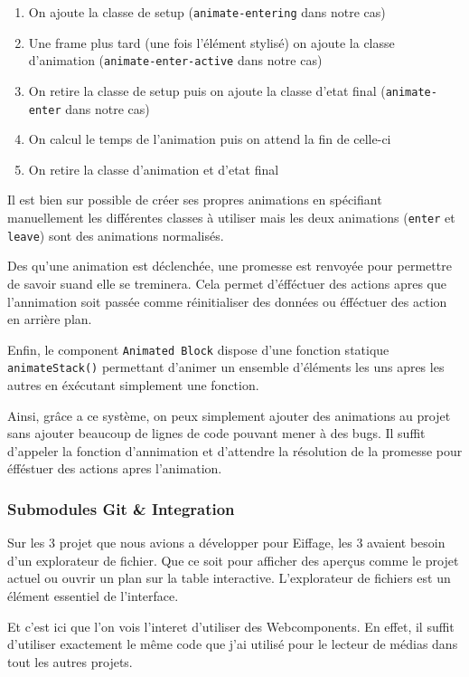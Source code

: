 \begin{enumerate}
    \item On ajoute la classe de setup (\texttt{animate-entering} dans notre cas)
    \item Une frame plus tard (une fois l'élément stylisé) on ajoute la classe d'animation (\texttt{animate-enter-active} dans notre cas)
    \item On retire la classe de setup puis on ajoute la classe d'etat final (\texttt{animate-enter} dans notre cas)
    \item On calcul le temps de l'animation puis on attend la fin de celle-ci
    \item On retire la classe d'animation et d'etat final
\end{enumerate}

Il est bien sur possible de créer ses propres animations en spécifiant manuellement les différentes classes à utiliser mais les deux animations (\texttt{enter} et \texttt{leave}) sont des animations normalisés.

Des qu'une animation est déclenchée, une promesse est renvoyée pour permettre de savoir suand elle se treminera.
Cela permet d'éfféctuer des actions apres que l'annimation soit passée comme réinitialiser des données ou éfféctuer des action en arrière plan.

Enfin, le component \texttt{Animated Block} dispose d'une fonction statique \texttt{animateStack()} permettant d'animer un ensemble d'éléments les uns apres les autres en éxécutant simplement une fonction.

Ainsi, grâce a ce système, on peux simplement ajouter des animations au projet sans ajouter beaucoup de lignes de code pouvant mener à des bugs.
Il suffit d'appeler la fonction d'annimation et d'attendre la résolution de la promesse pour éfféstuer des actions apres l'animation.

\subsubsection{Submodules Git \& Integration}

Sur les 3 projet que nous avions a développer pour Eiffage, les 3 avaient besoin d'un explorateur de fichier.
Que ce soit pour afficher des aperçus comme le projet actuel ou ouvrir un plan sur la table interactive.
L'explorateur de fichiers est un élément essentiel de l'interface.

Et c'est ici que l'on vois l'interet d'utiliser des Webcomponents.
En effet, il suffit d'utiliser exactement le même code que j'ai utilisé pour le lecteur de médias dans tout les autres projets.

